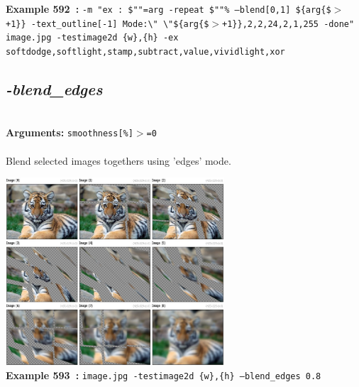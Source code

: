 \documentclass[a4paper,11pt,twoside]{book}
\begin{document}
\begin{center}
{\footnotesize \textbf{Example 592~:} \texttt{-m "ex : \$""=arg -repeat \$""\% --blend[0,1] \$\{arg\{\$$>$+1\}\} -text\_outline[-1] Mode:\textbackslash " \textbackslash "\$\{arg\{\$$>$+1\}\},2,2,24,2,1,255 -done" image.jpg -testimage2d \{w\},\{h\} -ex softdodge,softlight,stamp,subtract,value,vividlight,xor}}
\end{center}

\subsection{\emph{-blend\_edges} }\vspace*{-0.5em}
~\\\textbf{Arguments: } 
{\small \texttt{smoothness[\%]$>$=0}}\\~\\
Blend selected images togethers using 'edges' mode.
\begin{center}\includegraphics[keepaspectratio=true,height=7cm,width=\textwidth]{img/gmic_def593.jpg}\\
{\footnotesize \textbf{Example 593~:} \texttt{image.jpg -testimage2d \{w\},\{h\} --blend\_edges 0.8}}
\end{center}
\end{document}
